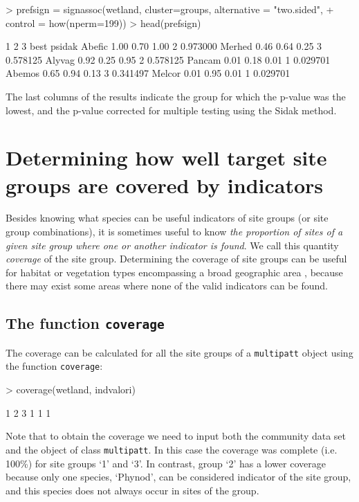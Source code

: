 \documentclass[11pt,a4paper]{article}
\begin{document}
\begin{Schunk}
\begin{Sinput}
> prefsign = signassoc(wetland, cluster=groups,  alternative = "two.sided", 
+                      control = how(nperm=199)) 
> head(prefsign)
\end{Sinput}
\begin{Soutput}
          1    2    3 best   psidak
Abefic 1.00 0.70 1.00    2 0.973000
Merhed 0.46 0.64 0.25    3 0.578125
Alyvag 0.92 0.25 0.95    2 0.578125
Pancam 0.01 0.18 0.01    1 0.029701
Abemos 0.65 0.94 0.13    3 0.341497
Melcor 0.01 0.95 0.01    1 0.029701
\end{Soutput}
\end{Schunk}
The last columns of the results indicate the group for which the p-value was the lowest, and the p-value corrected for multiple testing using the Sidak method.

\section{Determining how well target site groups are covered by indicators}
Besides knowing what species can be useful indicators of site groups (or site group combinations), it is sometimes useful to know \emph{the proportion of sites of a given site group where one or another indicator is found}. We call this quantity \emph{coverage} of the site group. Determining the coverage of site groups can be useful for habitat or vegetation types encompassing a broad geographic area \citep{DeCaceres2012}, because there may exist some areas where none of the valid indicators can be found.  
\subsection{The function \texttt{coverage}}
The coverage can be calculated for all the site groups of a \texttt{multipatt} object using the function \texttt{coverage}:
\begin{Schunk}
\begin{Sinput}
> coverage(wetland, indvalori)
\end{Sinput}
\begin{Soutput}
1 2 3 
1 1 1 
\end{Soutput}
\end{Schunk}
Note that to obtain the coverage we need to input both the community data set and the object of class \texttt{multipatt}. In this case the coverage was complete (i.e. 100\%) for site groups `1' and `3'. In contrast, group `2' has a lower coverage because only one species, `Phynod', can be considered indicator of the site group, and this species does not always occur in sites of the group. 
\end{document}
